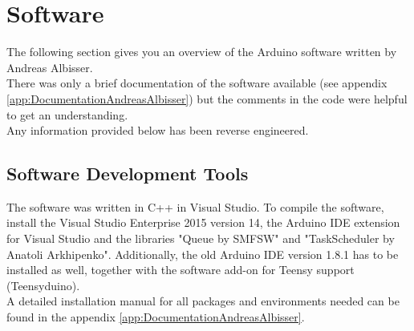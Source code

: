\section{Software} \label{sec:txtArduinoSoftwareAnalysis}
%
%
The following section gives you an overview of the Arduino software written by Andreas Albisser. \\
There was only a brief documentation of the software available (see appendix \autoref{app:DocumentationAndreasAlbisser}) but the comments in the code were helpful to get an understanding.\\
Any information provided below has been reverse engineered.\\
%
\subsection{Software Development Tools}
The software was written in C++ in Visual Studio. To compile the software, install the Visual Studio Enterprise 2015 version 14, the Arduino IDE extension for Visual Studio and the libraries "Queue by SMFSW" and "TaskScheduler by Anatoli Arkhipenko". Additionally, the old Arduino IDE version 1.8.1 has to be installed as well, together with the software add-on for Teensy support (Teensyduino).\\
A detailed installation manual for all packages and environments needed can be found in the appendix \autoref{app:DocumentationAndreasAlbisser}.
%
